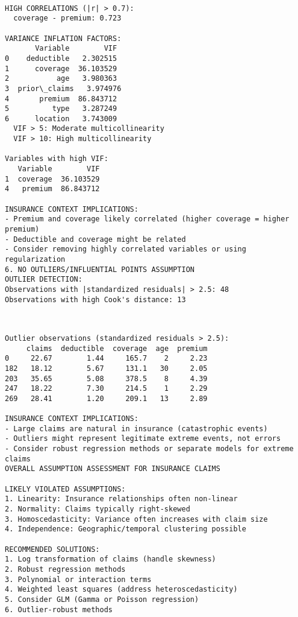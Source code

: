 \documentclass[8pt, twocolumn]{extarticle}
\begin{document}
    { \hspace*{\fill} \\}
    \begin{Verbatim}[commandchars=\\\{\}]
HIGH CORRELATIONS (|r| > 0.7):
  coverage - premium: 0.723

VARIANCE INFLATION FACTORS:
       Variable        VIF
0    deductible   2.302515
1      coverage  36.103529
2           age   3.980363
3  prior\_claims   3.974976
4       premium  86.843712
5          type   3.287249
6      location   3.743009
  VIF > 5: Moderate multicollinearity
  VIF > 10: High multicollinearity

Variables with high VIF:
   Variable        VIF
1  coverage  36.103529
4   premium  86.843712

INSURANCE CONTEXT IMPLICATIONS:
- Premium and coverage likely correlated (higher coverage = higher premium)
- Deductible and coverage might be related
- Consider removing highly correlated variables or using regularization
6. NO OUTLIERS/INFLUENTIAL POINTS ASSUMPTION
OUTLIER DETECTION:
Observations with |standardized residuals| > 2.5: 48
Observations with high Cook's distance: 13
    \end{Verbatim}
    \begin{center}
    \end{center}
    { \hspace*{\fill} \\}
    \begin{Verbatim}[commandchars=\\\{\}]
Outlier observations (standardized residuals > 2.5):
     claims  deductible  coverage  age  premium
0     22.67        1.44     165.7    2     2.23
182   18.12        5.67     131.1   30     2.05
203   35.65        5.08     378.5    8     4.39
247   18.22        7.30     214.5    1     2.29
269   28.41        1.20     209.1   13     2.89

INSURANCE CONTEXT IMPLICATIONS:
- Large claims are natural in insurance (catastrophic events)
- Outliers might represent legitimate extreme events, not errors
- Consider robust regression methods or separate models for extreme claims
OVERALL ASSUMPTION ASSESSMENT FOR INSURANCE CLAIMS

LIKELY VIOLATED ASSUMPTIONS:
1. Linearity: Insurance relationships often non-linear
2. Normality: Claims typically right-skewed
3. Homoscedasticity: Variance often increases with claim size
4. Independence: Geographic/temporal clustering possible

RECOMMENDED SOLUTIONS:
1. Log transformation of claims (handle skewness)
2. Robust regression methods
3. Polynomial or interaction terms
4. Weighted least squares (address heteroscedasticity)
5. Consider GLM (Gamma or Poisson regression)
6. Outlier-robust methods
    \end{Verbatim}
\end{document}
